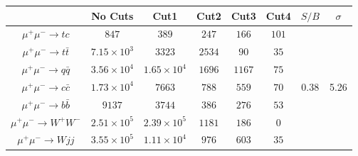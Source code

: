 \documentclass[a4paper,11pt]{article}
\begin{document}
\begin{center}
\begin{table}
  \begin{center}
  \begin{tabular}{|c|c|c|c|c|c|c|c|}
  \hline
  &  No Cuts  &     Cut1   &  Cut2  & Cut3 & Cut4 &  $S/B$  &    $\sigma$   \\
  \hline
  $\mu^+\mu^-\to tc$   &  $847$   & $389$  &  $247$  &  $166$ & $101$  &  \multirow{8}{*}{0.38} & \multirow{8}{*}{5.26} \\
  $\mu^+\mu^-\to t\bar{t}$     &   $7.15\times{10^3}$  &       $3323$  &  $2534$ & $90$ & $35$  & & \\
  $\mu^+\mu^-\to q\bar{q}$     &   $3.56\times{10^4}$   & $1.65\times{10^4}$  &    $1696$    &  $1167$ & $75$ &   &  \\
  $\mu^+\mu^-\to c\bar{c}$     &   $1.73\times{10^4}$  &  $7663$  &    $788$    &  $559$ & $70$ &   &  \\
  $\mu^+\mu^-\to b\bar{b}$     &   $9137$  & $3744$  &    $386$    &  $276$ & $53$ &   &  \\
  $\mu^+\mu^-\to W^+W^-$  & $2.51\times{10^5}$   & $2.39\times{10^5}$  & $1181$ &  $186$ & $0$ & & \\
  $\mu^+\mu^-\to Wjj$  & $3.55\times{10^5}$  & $1.11\times{10^4}$  &  $976$   &  $603$ & $35$  & & \\

\end{tabular}
\end{center}
\end{table}
\end{center}
\end{document}
